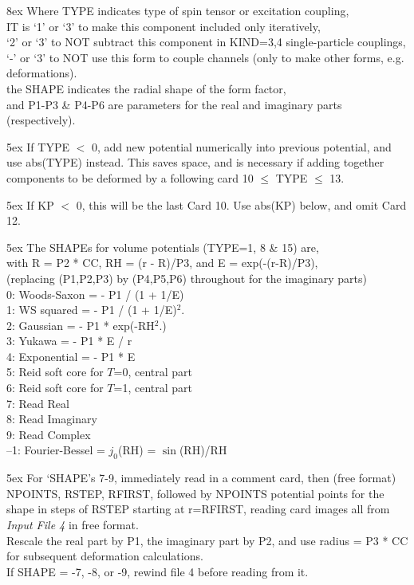 \documentclass[11pt]{article}
\begin{document}
%
%
\hangindent 8ex  Where
      TYPE indicates type of spin tensor or excitation coupling,
\\  IT is `1' or `3' to make this component included only iteratively,\\
 \hspace*{8mm} `2' or `3' to NOT subtract this component in KIND=3,4 single-particle
 couplings,\\
 \hspace*{8mm} `-' or `3' to NOT use this form to couple channels (only  to make other forms, e.g. deformations).
 \\  the SHAPE indicates the radial shape of the form factor,
\\  and P1-P3 \& P4-P6 are parameters for the real and imaginary
parts (respectively).


\medskip

\hangindent 5ex
If TYPE $<$ 0, add new potential numerically into previous potential,
and use abs(TYPE) instead.   This saves space, and is necessary if adding
together components to be deformed by a following card 10 $\leq$ TYPE $\leq$ 13.

\hangindent 5ex
If KP $<$ 0, this will be the last Card 10.  Use abs(KP) below,
and omit Card 12.
\bigskip

\hangindent 5ex
The SHAPEs for volume potentials (TYPE=1, 8 \& 15) are,
\\
with R = P2 * CC, RH = (r - R)/P3, and E = exp(-(r-R)/P3),
\\
(replacing (P1,P2,P3) by (P4,P5,P6) throughout for the imaginary parts)\\
%
   0: Woods-Saxon  = - P1 / (1 + 1/E)
\\ 1: WS squared   = - P1 / (1 + 1/E)$^2$.
\\ 2: Gaussian     = - P1 * exp(-RH$^2$.)
\\ 3: Yukawa       = - P1 * E / r
\\ 4: Exponential  = - P1 * E
\\ 5: Reid soft core for $T$=0, central part
\\ 6: Reid soft core for $T$=1, central part
\\ 7: Read Real
\\ 8: Read Imaginary
\\ 9: Read Complex
\\--1: Fourier-Bessel = $j_0$(RH) = $\sin$(RH)/RH


\hangindent 5ex
For `SHAPE's 7-9, immediately read in a comment card,
then (free format) NPOINTS, RSTEP, RFIRST,
followed by NPOINTS potential points
for the shape in steps of RSTEP starting at r=RFIRST,
reading card images all from {\em Input File 4} in free format.
\\
Rescale the real part by P1, the imaginary part by P2,
and use radius = P3 * CC for subsequent deformation calculations.
\\
If SHAPE = -7, -8, or -9, rewind file 4 before reading from it.
\bigskip
\end{document}
